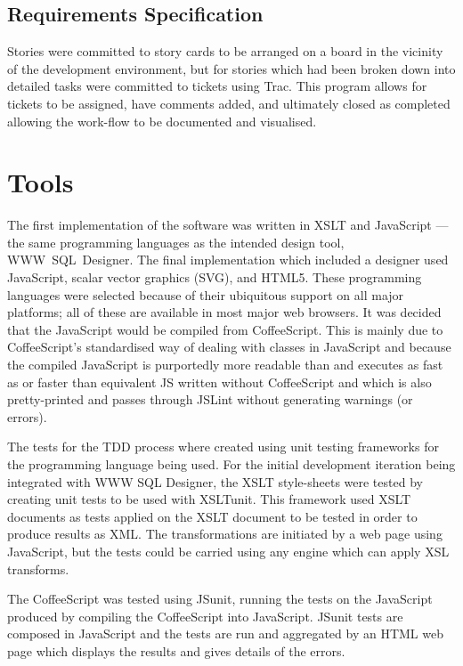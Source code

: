 \subsection*{Requirements Specification}
Stories were committed to story cards to be arranged on a board in the vicinity of the development environment, but for stories which had been broken down into detailed tasks were committed to tickets using Trac. This program allows for tickets to be assigned, have comments added, and ultimately closed as completed allowing the work-flow to be documented and visualised.

\section{Tools}
The first implementation of the software was written in XSLT and JavaScript --- the same programming languages as the intended design tool, \mbox{WWW SQL Designer}. The final implementation which included a designer used JavaScript, scalar vector graphics (SVG), and HTML5. These programming languages were selected because of their ubiquitous support on all major platforms; all of these are available in most major web browsers. It was decided that the Java\-Script would be compiled from Coffee\-Script. This is mainly due to Coffee\-Script's standardised way of dealing with classes in Java\-Script and because the compiled Java\-Script is purportedly more readable than and executes as fast as or faster than equivalent JS written without Coffee\-Script and which is also pretty-printed and passes through JSLint without generating warnings (or errors).

The tests for the TDD process where created using unit testing frameworks for the programming language being used. For the initial development iteration being integrated with WWW SQL Designer, the XSLT style-sheets were tested by creating unit tests to be used with XSLTunit. This framework used XSLT documents as tests applied on the XSLT document to be tested in order to produce results as XML. The transformations are initiated by a web page using Java\-Script, but the tests could be carried using any engine which can apply XSL transforms.

The Coffee\-Script was tested using JSunit, running the tests on the Java\-Script produced by compiling the Coffee\-Script into Java\-Script. JSunit tests are composed in Java\-Script and the tests are run and aggregated by an HTML web page which displays the results and gives details of the errors.

